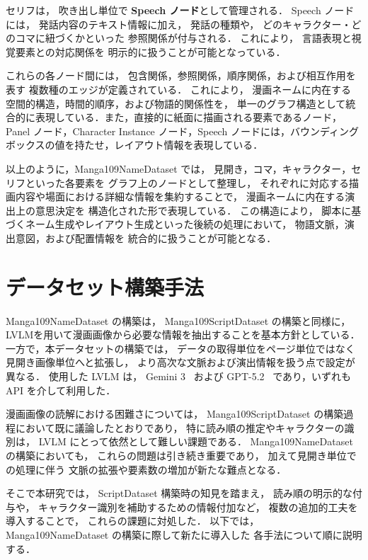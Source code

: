 \documentclass[a4j,12pt,dvipdfmx]{jsreport}
\begin{document}
セリフは，
吹き出し単位で \textbf{Speech ノード}として管理される．
Speech ノードには，
発話内容のテキスト情報に加え，
発話の種類や，
どのキャラクター・どのコマに紐づくかといった
参照関係が付与される．
これにより，
言語表現と視覚要素との対応関係を
明示的に扱うことが可能となっている．

これらの各ノード間には，
包含関係，参照関係，順序関係，および相互作用を表す
複数種のエッジが定義されている．
これにより，
漫画ネームに内在する
空間的構造，時間的順序，および物語的関係性を，
単一のグラフ構造として統合的に表現している．また，直接的に紙面に描画される要素であるノード，Panel ノード，Character Instance ノード，Speech ノードには，バウンディングボックスの値を持たせ，レイアウト情報を表現している．

以上のように，Manga109NameDataset では，
見開き，コマ，キャラクター，セリフといった各要素を
グラフ上のノードとして整理し，
それぞれに対応する描画内容や場面における詳細な情報を集約することで，
漫画ネームに内在する演出上の意思決定を
構造化された形で表現している．
この構造により，
脚本に基づくネーム生成やレイアウト生成といった後続の処理において，
物語文脈，演出意図，および配置情報を
統合的に扱うことが可能となる．

\section{データセット構築手法}\label{sec:name_construction}
Manga109NameDataset の構築は，
Manga109ScriptDataset の構築と同様に，
LVLMを用いて漫画画像から必要な情報を抽出することを基本方針としている．
一方で，本データセットの構築では，
データの取得単位をページ単位ではなく見開き画像単位へと拡張し，
より高次な文脈および演出情報を扱う点で設定が異なる．
使用した LVLM は，
Gemini 3~\cite{woodward2025gemini3} および GPT-5.2~\cite{openai2025gpt52} であり，いずれも API を介して利用した．

漫画画像の読解における困難さについては，
Manga109ScriptDataset の構築過程において既に議論したとおりであり，
特に読み順の推定やキャラクターの識別は，
LVLM にとって依然として難しい課題である．
Manga109NameDataset の構築においても，
これらの問題は引き続き重要であり，
加えて見開き単位での処理に伴う
文脈の拡張や要素数の増加が新たな難点となる．

そこで本研究では，
ScriptDataset 構築時の知見を踏まえ，
読み順の明示的な付与や，
キャラクター識別を補助するための情報付加など，
複数の追加的工夫を導入することで，
これらの課題に対処した．
以下では，
Manga109NameDataset の構築に際して新たに導入した
各手法について順に説明する．
\end{document}

